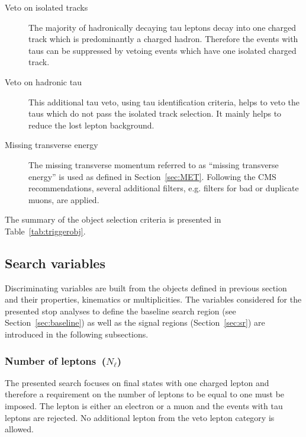 \begin{description}
\item[Veto on isolated tracks]
The majority of hadronically decaying tau leptons decay into one charged track which is predominantly a charged hadron. Therefore the events with taus can be suppressed by vetoing events which have one isolated charged track.

\item[Veto on hadronic tau]
This additional tau veto, using tau identification criteria, helps to veto the taus which do not pass the isolated track selection. It mainly helps to reduce the lost lepton background.

\item[Missing transverse energy]
The missing transverse momentum referred to as ``missing transverse energy'' is used as defined in Section~\ref{sec:MET}. Following the CMS recommendations, several additional \MET filters, e.g. filters for bad or duplicate muons, are applied.   
\end{description}

The summary of the object selection criteria is presented in Table~\ref{tab:triggerobj}.

\subsection{Search variables~\label{sec:variables}}

Discriminating variables are built from the objects defined in previous section and their properties, kinematics or multiplicities. The variables considered for the presented stop analyses to define the baseline search region (see Section~\ref{sec:baseline}) as well as the signal regions (Section~\ref{sec:sr}) are introduced in the following subsections.

\subsubsection{Number of leptons~($N_{\ell}$)}

The presented search focuses on final states with one charged lepton and therefore a requirement on the number of leptons to be equal to one must be imposed. The lepton is either an electron or a muon and the events with tau leptons are rejected. No additional lepton from the veto lepton category is allowed.

